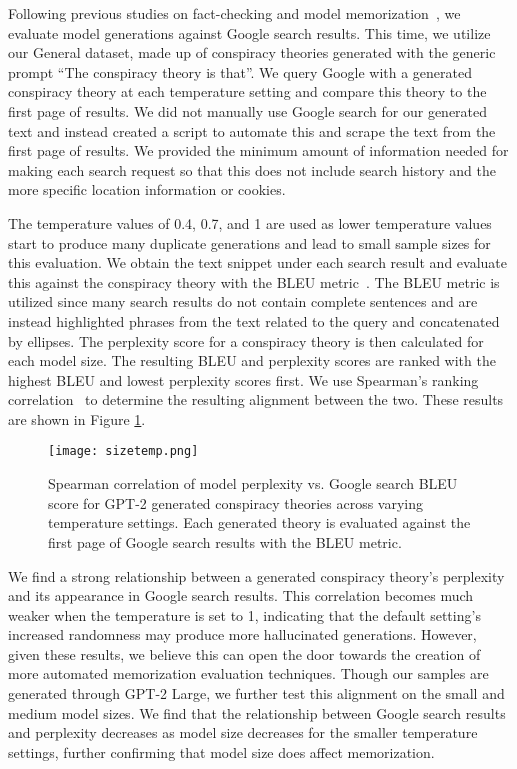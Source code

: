 \documentclass[11pt,a4paper]{article}
\begin{document}
Following previous studies on fact-checking \cite{chakrabarty-etal-2018-robust, Wang2010GotYA} and model memorization~\cite{carlini2020extracting}, we evaluate model generations against Google search results. This time, we utilize our General dataset, made up of conspiracy theories generated with the generic prompt ``The conspiracy theory is that''. We query Google with a generated conspiracy theory at each temperature setting and compare this theory to the first page of results. We did not manually use Google search for our generated text and instead created a script to automate this and scrape the text from the first page of results. We provided the minimum amount of information needed for making each search request so that this does not include search history and the more specific location information or cookies.


The temperature values of 0.4, 0.7, and 1 are used as lower temperature values start to produce many duplicate generations and lead to small sample sizes for this evaluation. We obtain the text snippet under each search result and evaluate this against the conspiracy theory with the BLEU metric~\cite{papineni-etal-2002-bleu}. The BLEU metric is utilized since many search results do not contain complete sentences and are instead highlighted phrases from the text related to the query and concatenated by ellipses. The perplexity score for a conspiracy theory is then calculated for each model size. The resulting BLEU and perplexity scores are ranked with the highest BLEU and lowest perplexity scores first. We use Spearman's ranking correlation~\cite{hogg2005introduction} to determine the resulting alignment between the two. These results are shown in Figure \ref{fig:tempxsize}. 

\begin{figure}[t]
  \centering
  \texttt{[image: sizetemp.png]}
  \caption{Spearman correlation of model perplexity vs. Google search BLEU score for GPT-2 generated conspiracy theories across varying temperature settings. Each generated theory is evaluated against the first page of Google search results with the BLEU metric.}\label{fig:tempxsize}
\end{figure}

We find a strong relationship between a generated conspiracy theory's perplexity and its appearance in Google search results. This correlation becomes much weaker when the temperature is set to 1, indicating that the default setting's increased randomness may produce more hallucinated generations. However, given these results, we believe this can open the door towards the creation of more automated memorization evaluation techniques. Though our samples are generated through GPT-2 Large, we further test this alignment on the small and medium model sizes. We find that the relationship between Google search results and perplexity decreases as model size decreases for the smaller temperature settings, further confirming that model size does affect memorization.
\end{document}
